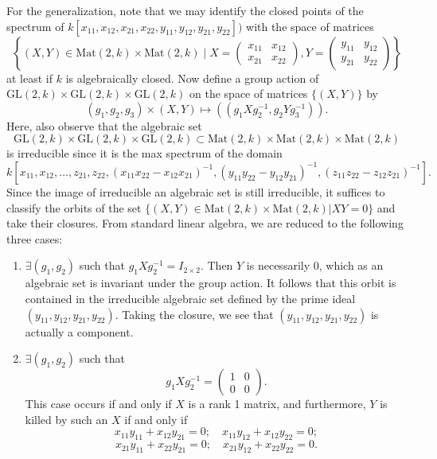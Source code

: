 \begin{example}
\medskip\noindent
For the generalization, note that we may identify the closed
points of the spectrum of
$k[x_{11}, x_{12}, x_{21}, x_{22}, y_{11}, y_{12}, y_{21}, y_{22}])$
with the space of matrices
$$
\left\{ (X, Y) \in \text{Mat}(2, k)\times \text{Mat}(2, k) \mid
X = \left(
\begin{matrix}
x_{11} & x_{12}\\
x_{21} & x_{22}
\end{matrix}
\right),
Y= \left(
\begin{matrix}
y_{11} & y_{12}\\
y_{21} & y_{22}
\end{matrix}
\right)
\right\}
$$
at least if $k$ is algebraically closed.
Now define a group action of
$\text{GL}(2, k)\times \text{GL}(2, k)\times \text{GL}(2, k)$
on the space of matrices $\{(X, Y)\}$ by
$$
(g_1, g_2, g_3) \times (X, Y) \mapsto ((g_1Xg_2^{-1}, g_2Yg_3^{-1})).
$$
Here, also observe that the algebraic set
$$
\text{GL}(2, k)\times \text{GL}(2, k)\times \text{GL}(2, k) \subset
\text{Mat}(2, k)\times \text{Mat}(2, k) \times \text{Mat}(2, k)
$$
is irreducible since it is the max spectrum of the domain
$$
k[x_{11}, x_{12}, \ldots, z_{21}, z_{22}, (x_{11}x_{22}-x_{12}x_{21})^{-1}
, (y_{11}y_{22}-y_{12}y_{21})^{-1}, (z_{11}z_{22}-z_{12}z_{21})^{-1}].
$$
Since the image of irreducible an algebraic set is still
irreducible, it suffices to classify the orbits of the set
$\{(X, Y)\in \text{Mat}(2, k)\times \text{Mat}(2, k)|XY = 0\}$ and take their
closures. From standard linear algebra, we are reduced to the
following three cases:
\begin{enumerate}
\item $\exists (g_1, g_2)$ such that $g_1Xg_2^{-1} = I_{2\times 2}$.
Then $Y$ is necessarily $0$, which as an algebraic set is
invariant under the group action. It follows that this orbit is
contained in the irreducible algebraic set defined by the prime
ideal $(y_{11}, y_{12}, y_{21}, y_{22})$. Taking the closure, we see
that $(y_{11}, y_{12}, y_{21}, y_{22})$ is actually a component.
\item $\exists (g_1, g_2)$ such that
$$
g_1Xg_2^{-1} = \left(
\begin{matrix}
1 & 0 \\
0 & 0
\end{matrix}
\right).
$$
This case occurs if and only if $X$ is a rank 1 matrix,
and furthermore, $Y$ is killed by such an $X$ if and only if
$$
x_{11}y_{11}+x_{12}y_{21} = 0; \quad x_{11}y_{12}+x_{12}y_{22} = 0;
$$
$$
x_{21}y_{11}+x_{22}y_{21} = 0; \quad x_{21}y_{12}+x_{22}y_{22} = 0.
$$
\end{enumerate}
\end{example}
